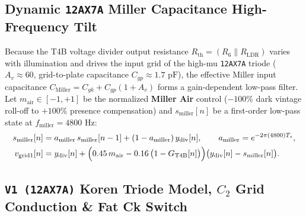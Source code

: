 \documentclass[11pt,a4paper]{article}
\begin{document}
\subsection{Dynamic \texttt{12AX7A} Miller Capacitance High-Frequency Tilt}

Because the T4B voltage divider output resistance $R_{\text{th}} = (R_6 \parallel R_{\text{LDR}})$ varies with illumination and drives the input grid of the high-mu \texttt{12AX7A} triode ($A_v \approx 60$, grid-to-plate capacitance $C_{gp} \approx 1.7\text{ pF}$), the effective Miller input capacitance $C_{\text{Miller}} = C_{gk} + C_{gp}(1 + A_v)$ forms a gain-dependent low-pass filter. Let $m_{\text{air}} \in [-1, +1]$ be the normalized \textbf{Miller Air} control ($-100\%$ dark vintage roll-off to $+100\%$ presence compensation) and $s_{\text{miller}}[n]$ be a first-order low-pass state at $f_{\text{miller}} = 4800\text{ Hz}$:
\begin{align}
    s_{\text{miller}}[n] &= a_{\text{miller}}\,s_{\text{miller}}[n-1] + (1 - a_{\text{miller}})\,y_{\text{div}}[n], \qquad a_{\text{miller}} = e^{-2\pi (4800) T_s}, \\
    v_{\text{grid1}}[n] &= y_{\text{div}}[n] + \Bigl(0.45\,m_{\text{air}} - 0.16\,\bigl(1 - G_{\text{T4B}}[n]\bigr)\Bigr)\bigl(y_{\text{div}}[n] - s_{\text{miller}}[n]\bigr).
\end{align}

\subsection{\texttt{V1 (12AX7A)} Koren Triode Model, \texorpdfstring{$C_2$}{C2} Grid Conduction \& \textbf{Fat Ck} Switch}
\end{document}
